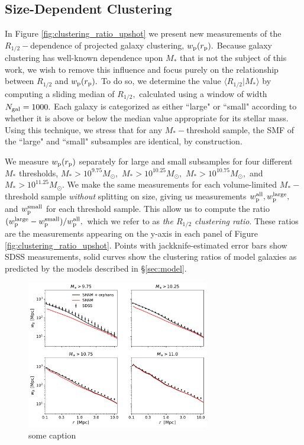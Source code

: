 \documentclass[usenatbib,usegraphicx,letterpaper]{mn2e}
\newcommand{\rhalf}{R_{1/2}}
\newcommand{\mstar}{M_{\ast}}
\newcommand{\rproj}{r_{\rm p}}
\newcommand{\wproj}{w_{\rm p}}
\newcommand{\wplarge}{w_{\rm p}^{\rm large}}
\newcommand{\wpsmall}{w_{\rm p}^{\rm small}}
\newcommand{\wpall}{w_{\rm p}^{\rm all}}
\newcommand{\msun}{M_\odot}
\begin{document}
\subsection{Size-Dependent Clustering}
\label{subsec:clustering_results}

In Figure \ref{fig:clustering_ratio_upshot} we present new measurements of the $\rhalf-$dependence of projected galaxy clustering, $\wproj(\rproj).$ Because galaxy clustering has well-known dependence upon $\mstar$ that is not the subject of this work, we wish to remove this influence and focus purely on the relationship between $\rhalf$ and $\wproj(\rproj).$ To do so, we determine the value $\langle\rhalf\vert\mstar\rangle$ by computing a sliding median of $\rhalf,$ calculated using a window of width $N_{\rm gal}=1000.$ Each galaxy is categorized as either ``large" or ``small" according to whether it is above or below the median value appropriate for its stellar mass. Using this technique, we stress that for any $\mstar-$threshold sample, the SMF of the ``large" and ``small" subsamples are identical, by construction.

We measure $\wproj(\rproj)$ separately for large and small subsamples for four different $\mstar$ thresholds, $\mstar>10^{9.75}\msun,$ $\mstar>10^{10.25}\msun,$ $\mstar>10^{10.75}\msun,$ and $\mstar>10^{11.25}\msun.$ We make the same measurements for each volume-limited $\mstar-$threshold sample {\em without} splitting on size, giving us measurements $\wpall, \wplarge,$ and $\wpsmall$ for each threshold sample. This allow us to compute the ratio $(\wplarge-\wpsmall)/\wpall,$ which we refer to as {\em the $\rhalf$ clustering ratio}. These ratios are the measurements appearing on the y-axis in each panel of Figure \ref{fig:clustering_ratio_upshot}. Points with jackknife-estimated error bars show SDSS measurements, solid curves show the clustering ratios of model galaxies as predicted by the models described in \S\ref{sec:model}.

\begin{figure}
\centering
\includegraphics[width=8cm]{FIGS/baseline_sham_orphans.pdf}
\caption{some caption}
\label{fig:baseline_sham_clustering}
\end{figure}
\end{document}

